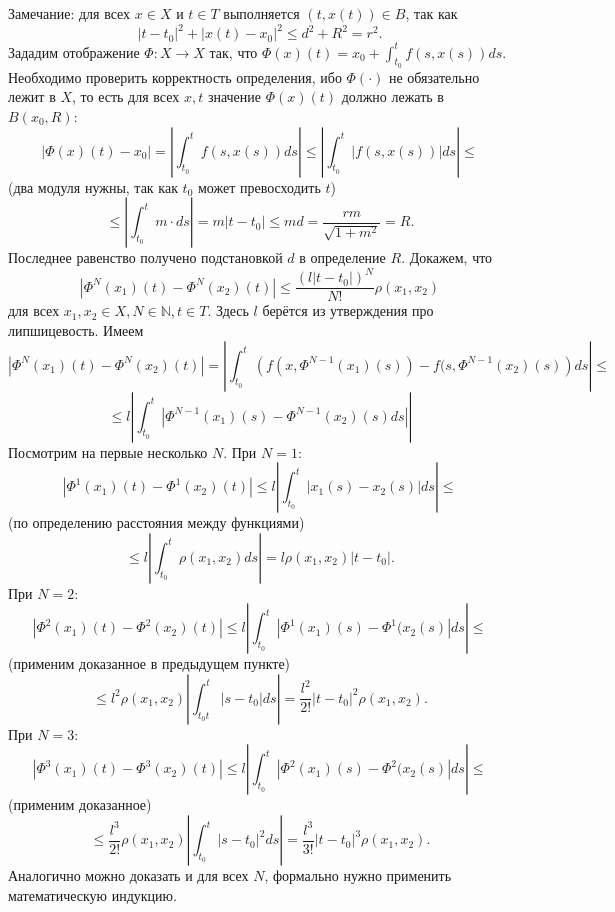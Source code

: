 Замечание: для всех $x \in X$ и $t \in T$ выполняется $(t, x(t)) \in B$, так как
\[
    |t - t_0|^2 + |x(t) - x_0|^2 \le d^2 + R^2 = r^2.
\]
Зададим отображение $\Phi: X \to X$ так, что $\Phi(x)(t) = x_0 + \int_{t_0}^{t} f(s, x(s))ds$.
Необходимо проверить корректность определения, ибо $\Phi(\cdot)$ не обязательно лежит в $X$, то есть для всех $x, t$ значение $\Phi(x)(t)$ должно лежать в $B(x_0, R)$:
\[
    |\Phi(x)(t) - x_0| = \left| \int_{t_0}^{t} f(s, x(s)) ds \right| \le \left| \int_{t_0}^{t} |f(s, x(s))|ds \right| \le
\]
(два модуля нужны, так как $t_0$ может превосходить $t$)
\[
    \le \left| \int_{t_0}^{t} m \cdot ds \right| = m|t - t_0| \le md = \frac{rm}{\sqrt {1 + m^2}} = R.
\]
Последнее равенство получено подстановкой $d$ в определение $R$.
Докажем, что 
\[
    |\Phi^N(x_1)(t) - \Phi^N(x_2)(t)| \le \frac{(l |t - t_0|)^N}{N!} \rho(x_1, x_2)
\]
для всех $x_1, x_2 \in X, N \in \mathbb N, t \in T$. Здесь $l$ берётся из утверждения про липшицевость.
Имеем 
\[
    |\Phi^N(x_1)(t) - \Phi^N(x_2)(t)| = \left| \int_{t_0}^{t} \left( f(x, \Phi^{N-1}(x_1)(s)) - f(s, \Phi^{N-1}(x_2)(s) \right) ds \right| \le
\]
\[
    \le l \left| \int_{t_0}^{t} |\Phi^{N-1}(x_1)(s) - \Phi^{N-1}(x_2)(s)ds| \right|
\]
Посмотрим на первые несколько $N$. При $N = 1$:
\[
    \left| \Phi^1(x_1)(t) - \Phi^1(x_2)(t) \right| \le l \left| \int_{t_0}^{t} |x_1(s) - x_2(s)|ds \right| \le
\]
(по определению расстояния между функциями)
\[
    \le l \left| \int_{t_0}^{t} \rho(x_1, x_2) ds \right| = l \rho(x_1, x_2) |t - t_0|.
\]
При $N = 2$:
\[
    \left| \Phi^2(x_1)(t) - \Phi^2(x_2)(t) \right| \le l \left| \int_{t_0}^{t} |\Phi^1(x_1)(s) - \Phi^1(x_2(s)| ds \right| \le
\]
(применим доказанное в предыдущем пункте)
\[
    \le l^2 \rho(x_1, x_2) \left| \int_{t_0t}^{t} |s-t_0|ds \right| = \frac{l^2}{2!} |t - t_0|^2 \rho(x_1, x_2).
\]
При $N = 3$:
\[
    \left| \Phi^3(x_1)(t) - \Phi^3(x_2)(t) \right| \le l \left| \int_{t_0}^{t} |\Phi^2(x_1)(s) - \Phi^2(x_2(s)| ds \right| \le
\]
(применим доказанное)
\[
    \le \frac{l^3}{2!} \rho(x_1, x_2) \left| \int_{t_0}^{t} |s-t_0|^2 ds \right| = \frac{l^3}{3!} |t - t_0|^3 \rho(x_1, x_2).
\]
Аналогично можно доказать и для всех $N$, формально нужно применить математическую индукцию.

